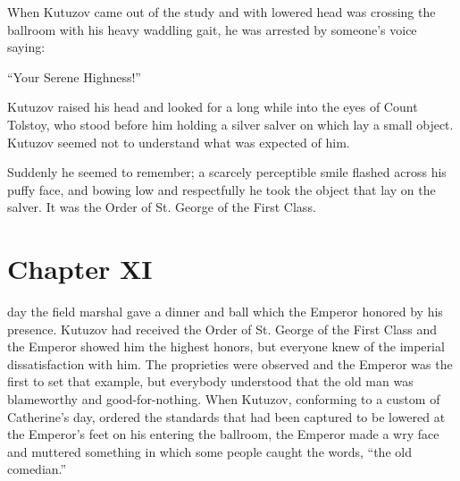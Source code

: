 When Kutuzov came out of the study and with lowered head was
crossing the ballroom with his heavy waddling gait, he was
arrested by someone's voice saying:

``Your Serene Highness!''

Kutuzov raised his head and looked for a long while into the eyes
of Count Tolstoy, who stood before him holding a silver salver on
which lay a small object. Kutuzov seemed not to understand what
was expected of him.

Suddenly he seemed to remember; a scarcely perceptible smile
flashed across his puffy face, and bowing low and respectfully he
took the object that lay on the salver. It was the Order of
St. George of the First Class.


\chapter*{Chapter XI}
\ifaudio 
{}
\fi

 day the field marshal gave a dinner and ball which the
Emperor honored by his presence. Kutuzov had received the Order
of St. George of the First Class and the Emperor showed him the
highest honors, but everyone knew of the imperial dissatisfaction
with him. The proprieties were observed and the Emperor was the
first to set that example, but everybody understood that the old
man was blameworthy and good-for-nothing. When Kutuzov,
conforming to a custom of Catherine's day, ordered the standards
that had been captured to be lowered at the Emperor's feet on his
entering the ballroom, the Emperor made a wry face and muttered
something in which some people caught the words, ``the old
comedian.''

